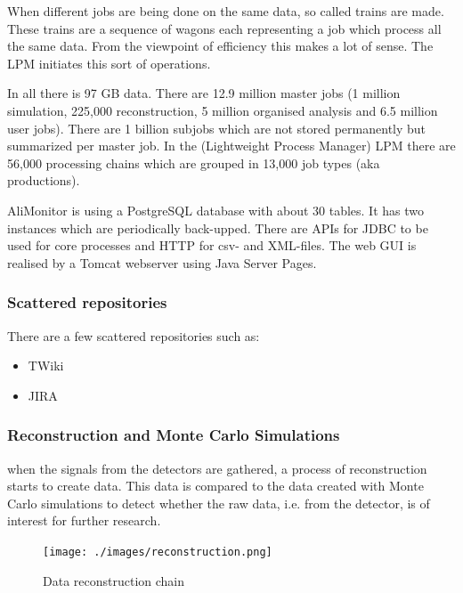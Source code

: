 When different jobs are being done on the same data, so called trains are made. These trains are a sequence of wagons each representing a job which process all the same data. From the viewpoint of efficiency this makes a lot of sense. The LPM initiates this sort of operations.

In all there is 97 GB data. There are 12.9 million master jobs (1 million simulation, 225,000 reconstruction, 5 million organised analysis and 6.5 million user jobs). There are 1 billion subjobs which are not stored permanently but summarized per master job. In the (Lightweight Process Manager) LPM there are 56,000 processing chains which are grouped in 13,000 job types (aka productions).

AliMonitor is using a PostgreSQL database with about 30 tables. It has two instances which are periodically back-upped. There are APIs for JDBC to be used for core processes and HTTP for csv- and XML-files. The web GUI is realised by a Tomcat webserver using Java Server Pages.

\subsubsection{Scattered repositories}
There are a few scattered repositories such as:
\begin{itemize}
  \item TWiki
  \item JIRA
\end{itemize}

\subsubsection{Reconstruction and Monte Carlo Simulations}
when the signals from the detectors are gathered, a process of reconstruction starts to create data. This data is compared to the data created with Monte Carlo simulations to detect whether the raw data, i.e. from the detector, is of interest for further research. 

\begin{figure}[h]
  \begin{center}
    \texttt{[image: ./images/reconstruction.png]}
    \caption{Data reconstruction chain}
    \label{fig:reconstruction}
  \end{center}
\end{figure}

